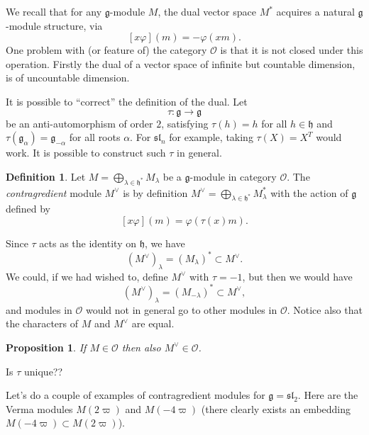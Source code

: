 \documentclass[12pt]{article}
\theoremstyle{plain}
\newtheorem{prop}[thm]{Proposition}
\theoremstyle{definition}
\newtheorem{defn}{Definition}[section]
\numberwithin{equation}{section}
\newcommand{\al}{\alpha}
\newcommand{\la}{\lambda}
\newcommand{\g}{\mathfrak{g}}
\newcommand{\h}{\mathfrak{h}}
\newcommand{\sll}{\mathfrak{sl}}
\newcommand{\OO}{\mathcal{O}}
\begin{document}
%







We recall that for any $\g$-module $M$, the dual vector space $M^*$ acquires a natural $\g$-module structure, via
\[
[x \varphi](m) = -\varphi(x m).
\]
One problem with (or feature of) the category $\OO$ is that it is not closed under this operation. Firstly the dual of a vector space of infinite but countable dimension, is of uncountable dimension.


It is possible to ``correct'' the definition of the dual. Let
\[
\tau : \g \rightarrow \g
\]
be an anti-automorphism of order $2$, satisfying $\tau(h) = h$ for all $h \in \h$ and $\tau(\g_\al) = \g_{-\al}$ for all roots $\al$. For $\sll_n$ for example, taking $\tau(X) = X^T$ would work. It is possible to construct such $\tau$ in general.
\begin{defn}
Let $M = \bigoplus_{\la \in \h^*} M_\la$ be a $\g$-module in category $\OO$. The \emph{contragredient} module $M^\vee$ is by definition $M^\vee = \bigoplus_{\la \in \h^*} M_\la^*$ with the action of $\g$ defined by
\[
[x \varphi](m) = \varphi(\tau(x) m).
\]
\end{defn}
Since $\tau$ acts as the identity on $\h$, we have
\[
(M^\vee)_\la = (M_\la)^* \subset M^\vee.
\]
We could, if we had wished to, define $M^\vee$ with $\tau = -1$, but then we would have
\[
(M^\vee)_\la = (M_{-\la})^* \subset M^\vee,
\]
and modules in $\OO$ would not in general go to other modules in $\OO$. Notice also that the characters of $M$ and $M^\vee$ are equal.

\begin{prop}
If $M \in \OO$ then also $M^\vee \in \OO$.
\end{prop}

{\color{red}Is $\tau$ unique??}

Let's do a couple of examples of contragredient modules for $\g = \sll_2$. Here are the Verma modules $M(2\varpi)$ and $M(-4\varpi)$ (there clearly exists an embedding $M(-4\varpi) \subset M(2\varpi)$).
\end{document}
